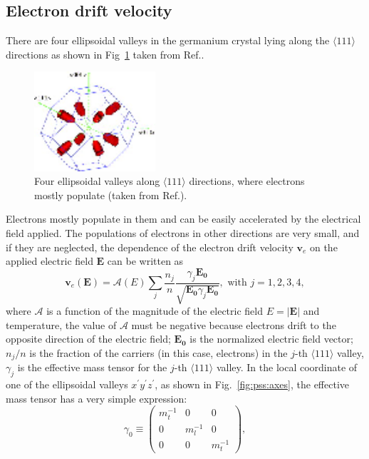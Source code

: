 \subsection{Electron drift velocity}
\label{sec:pss:elec}
There are four ellipsoidal valleys in the germanium crystal lying along the $\langle111\rangle$ directions as shown in Fig~\ref{fig:pss:valley} taken from Ref.\cite{bart}. 
\begin{figure}
\centering
\includegraphics[width=0.4\textwidth]{valleys}  
\caption{Four ellipsoidal valleys along $\langle111\rangle$ directions, where electrons mostly populate (taken from Ref.\cite{bart}).}
\label{fig:pss:valley}
\end{figure}
Electrons mostly populate in them and can be easily accelerated by the electrical field applied. The populations of electrons in other directions are very small, and if they are neglected, the dependence of the electron drift velocity $\mathbf{v}_{e}$ on the applied electric field $\mathbf{E}$ can be written as
\begin{equation}
\label{eq:pss:ed}
\mathbf{v}_{e}(\mathbf{E}) = \mathcal{A}(E) \sum_{j} \frac{n_{j}}{n} \frac{\gamma_{j}\mathbf{E_{0}}}{\sqrt{\mathbf{E_{0}}\gamma_{j}\mathbf{E_{0}}}}, \mbox{ with } j=1,2,3,4,
\end{equation}
where $\mathcal{A}$ is a function of the magnitude of the electric field $E=|\mathbf{E}|$ and temperature, the value of $\mathcal{A}$ must be negative because electrons drift to the opposite direction of the electric field; $\mathbf{E_{0}}$ is the normalized electric field vector; $n_{j}/n$ is the fraction of the carriers (in this case, electrons) in the $j$-th $\langle111\rangle$ valley, $\gamma_{j}$ is the effective mass tensor for the $j$-th $\langle111\rangle$ valley. In the local coordinate of one of the ellipsoidal valleys $x^{\prime}y^{\prime}z^{\prime}$, as shown in Fig.~\ref{fig:pss:axes}, the effective mass tensor has a very simple expression:
\begin{equation}
\label{eq:pss:g0}
\gamma_{0} \equiv \left(
\begin{array}{ccc}
m_{t}^{-1} & 0 & 0 \\
0 & m_{l}^{-1} & 0 \\
0 & 0 & m_{t}^{-1}
\end{array} \right),
\end{equation}
